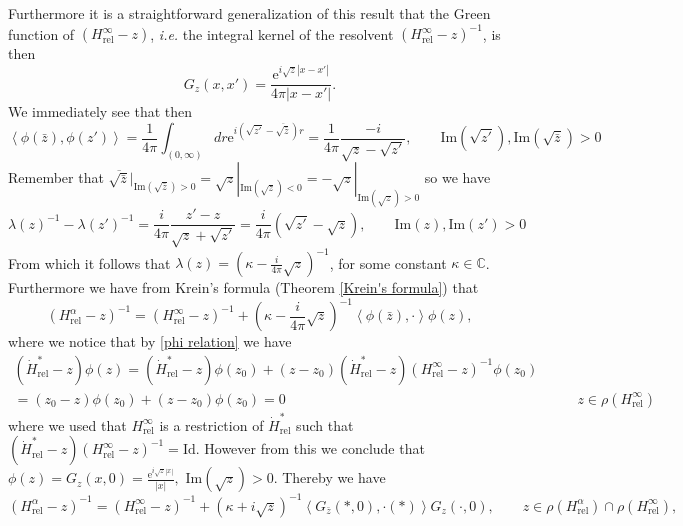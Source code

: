 \documentclass[a4paper,11pt]{article}
\newcommand{\euler}[1]{\text{e}^{#1}}
\newcommand{\Imag}{\text{Im}}
\renewcommand{\braket}[1]{\left\langle#1\right\rangle}
\newcommand{\ie}{\emph{i.e.} }
\newcommand{\C}{\mathbb{C}}
\numberwithin{equation}{section}
\begin{document}
Furthermore it is a straightforward generalization of this result that the Green function of $ (H_{\text{rel}}^\infty-z) $, \ie the integral kernel of the resolvent $ (H_{\text{rel}}^\infty-z)^{-1} $, is then \begin{equation}
G_z(x,x')=\frac{\euler{i\sqrt{z}|x-x'|}}{4\pi|x-x'|}.
\end{equation}
We immediately see that then\begin{equation}
\braket{\phi(\bar{z}),\phi(z')}=\frac{1}{4\pi}\int_{(0,\infty)}dr\euler{i(\sqrt{z'}-\overline{\sqrt{\bar{z}}})r}=\frac{1}{4\pi}\frac{-i}{\sqrt{z}-\sqrt{z'}},\qquad \Imag(\sqrt{z'}),\Imag(\sqrt{\bar{z}})>0
\end{equation}
Remember that $ \overline{\sqrt{\bar{z}}}\rvert_{\Imag(\sqrt{\bar{z}})>0}=\sqrt{z}|_{\Imag(\sqrt{z})<0}=-\sqrt{z}|_{\Imag(\sqrt{z})>0} $
so we have \begin{equation}
\lambda(z)^{-1}-\lambda(z')^{-1}=\frac{i}{4\pi}\frac{z'-z}{\sqrt{z}+\sqrt{z'}}=\frac{i}{4\pi}(\sqrt{z'}-\sqrt{z}),\qquad \Imag(z),\Imag(z')>0
\end{equation}
From which it follows that $ \lambda(z)=(\kappa-\frac{i}{4\pi}\sqrt{z})^{-1} $, for some constant $ \kappa\in\C $. Furthermore we have from Krein's formula (Theorem \ref{Krein's formula}) that \begin{equation}
(H_{\text{rel}}^\alpha-z)^{-1}=(H_{\text{rel}}^\infty-z)^{-1}+(\kappa-\frac{i}{4\pi}\sqrt{z})^{-1}\braket{\phi(\bar{z}),\cdot}\phi(z),
\end{equation}
where we notice that by \eqref{phi relation} we have\begin{equation}
\begin{aligned}
(\dot{H}_{\text{rel}}^*-z)\phi(z)=(\dot{H}_{\text{rel}}^*-z)\phi(z_0)+(z-z_0)(\dot{H}_{\text{rel}}^*-z)(H_{\text{rel}}^\infty-z)^{-1}\phi(z_0)&\\
=(z_0-z)\phi(z_0)+(z-z_0)\phi(z_0)=0&\qquad z\in\rho(H_{\text{rel}}^\infty)
\end{aligned}
\end{equation}
where we used that $ H_{\text{rel}}^\infty $ is a restriction of $ \dot{H}_{\text{rel}}^* $ such that $ (\dot{H}_{\text{rel}}^*-z)(H_{\text{rel}}^\infty-z)^{-1}=\text{Id} $. However from this we conclude that $ \phi(z)=G_{z}(x,0)=\frac{\euler{i\sqrt{z}|x|}}{|x|}, $ $ \Imag(\sqrt{z})>0 $. Thereby we have \begin{equation}
(H_{\text{rel}}^\alpha-z)^{-1}=(H_{\text{rel}}^\infty-z)^{-1}+(\kappa+i\sqrt{z})^{-1}\braket{G_{\bar{z}}(\ast,0),\cdot(\ast)}G_z(\cdot,0),\qquad z\in\rho(H_{\text{rel}}^\alpha)\cap\rho(H_{\text{rel}}^\infty),
\end{equation}
\end{document}
